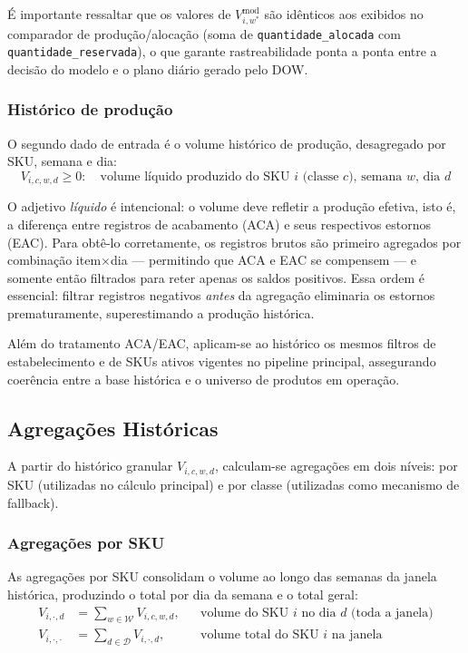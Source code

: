 \documentclass[11pt,a4paper]{article}
\begin{document}
\noindent É importante ressaltar que os valores de $V^{\text{mod}}_{i,w^*}$ são
idênticos aos exibidos no comparador de produção/alocação (soma de
\texttt{quantidade\_alocada} com \texttt{quantidade\_reservada}), o que garante
rastreabilidade ponta a ponta entre a decisão do modelo e o plano diário
gerado pelo DOW.

\subsubsection{Histórico de produção}

O segundo dado de entrada é o volume histórico de produção, desagregado por
SKU, semana e dia:
\begin{equation}\label{eq:dow:historico}
V_{i,c,w,d} \geq 0: \quad \text{volume líquido produzido do SKU } i
    \text{ (classe } c\text{), semana } w\text{, dia } d
\end{equation}

O adjetivo \emph{líquido} é intencional: o volume deve refletir a produção
efetiva, isto é, a diferença entre registros de acabamento (ACA) e seus
respectivos estornos (EAC). Para obtê-lo corretamente, os registros brutos
são primeiro agregados por combinação item$\times$dia --- permitindo que
ACA e EAC se compensem --- e somente então filtrados para reter apenas os
saldos positivos. Essa ordem é essencial: filtrar registros negativos
\emph{antes} da agregação eliminaria os estornos prematuramente,
superestimando a produção histórica.

Além do tratamento ACA/EAC, aplicam-se ao histórico os mesmos filtros de
estabelecimento e de SKUs ativos vigentes no pipeline principal,
assegurando coerência entre a base histórica e o universo de produtos
em operação.

\subsection{Agregações Históricas}

A partir do histórico granular $V_{i,c,w,d}$, calculam-se agregações em dois
níveis: por SKU (utilizadas no cálculo principal) e por classe (utilizadas
como mecanismo de fallback).

\subsubsection{Agregações por SKU}

As agregações por SKU consolidam o volume ao longo das semanas da janela
histórica, produzindo o total por dia da semana e o total geral:
\begin{align}\label{eq:dow:agg-sku}
V_{i,\cdot,d} &= \sum_{w \in \mathcal{W}} V_{i,c,w,d},
    && \text{volume do SKU } i \text{ no dia } d \text{ (toda a janela)} \\
V_{i,\cdot,\cdot} &= \sum_{d \in \mathcal{D}} V_{i,\cdot,d},
    && \text{volume total do SKU } i \text{ na janela}
\end{align}
\end{document}
